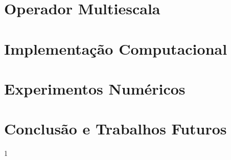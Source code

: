 \documentclass[msc,numbers]{coppe}
\def\realreservoir{1}
\begin{document}
  \chapter{Operador Multiescala}\label{ch:multiescala}
  

  \chapter{Implementação Computacional}\label{ch:implementacao}
  
  
  \chapter{Experimentos Numéricos} \label{ch:resultados}
  

  \chapter{Conclusão e Trabalhos Futuros} \label{ch:conclusoes}
  
  
  \backmatter
  
  

  \appendix
  
  
\if\realreservoir1
  
\fi


  
  
\end{document}
